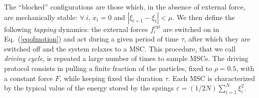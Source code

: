\documentclass[prl,twocolumn,floats,floatfix,aps,superscriptaddress,showpacs]{revtex4-1}
\newcommand{\fei}{f^{\textrm{ext}}_i}
\newcommand{\ve}{\varepsilon}
\begin{document}
The ``blocked'' configurations are those which, in the absence of
external force, are mechanically stable: $\forall~i$, $\dot{x}_i=0$
and $|\xi_{i+1}-\xi_i|<\mu$.  We then define the following
\emph{tapping} dynamics: the external forces $\fei$ are switched on in
Eq.~(\ref{eqofmotion}) and act during a given period of time $\tau$,
after which they are switched off and the system relaxes to a MSC.
This procedure, that we call \emph{driving cycle}, is repeated a large
number of times to sample MSCs. The driving protocol 
consists in pulling a finite fraction of the particles, fixed to
$\rho=0.5$, with a constant force $F$, while keeping fixed the
duration $\tau$. Each MSC is characterized by the typical value of the
energy stored by the springs $\ve=(1/2N)\sum_{i=1}^N\xi_i^2$. \\
\end{document}
